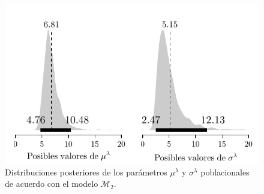 \documentclass{article}
\begin{document}
\begin{figure}[H]
\centerline{\includegraphics[width=.8\textwidth]{hierarchical_lambda_m2.pdf}}
\caption{Distribuciones posteriores de los parámetros $\mu^\lambda$ y $\sigma^\lambda$ poblacionales de acuerdo con el modelo $\mathcal M_2$.}
\label{fig:hierarchical_lambda_m2}
\end{figure}
\end{document}
